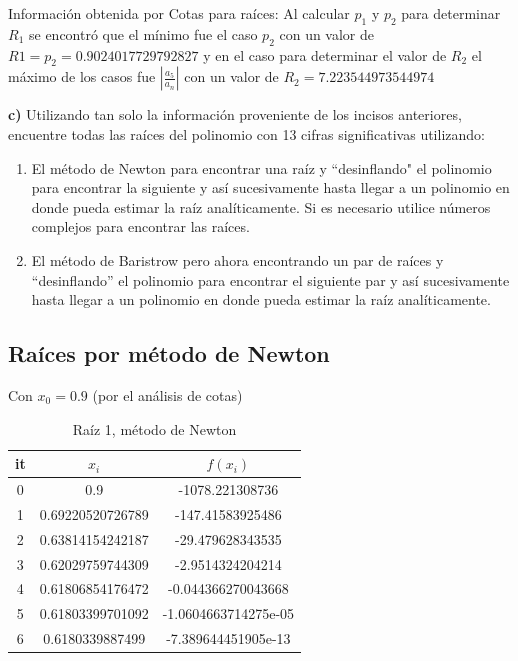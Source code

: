 \documentclass{article} %
\begin{document}
Información obtenida por Cotas para raíces: Al calcular $p_1$ y $p_2$ para determinar $R_1$ se encontró que el mínimo fue el caso $p_2$ con un valor de $R1= p_2 = 0.9024017729792827$ y en el caso para determinar el valor de $R_2$ el máximo de los casos fue $|\frac{a_5}{a_n}|$ con un valor de $R_2 = 7.223544973544974$

\textbf{c)} Utilizando tan solo la información proveniente de los incisos anteriores, encuentre todas las raíces del polinomio con 13 cifras significativas utilizando:

\begin{enumerate}
    \item El método de Newton para encontrar una raíz y ``desinflando" el polinomio para encontrar la siguiente y así sucesivamente hasta llegar a un polinomio en donde pueda estimar la raíz analíticamente. Si es necesario utilice números complejos para encontrar las raíces.
    \item El método de Baristrow pero ahora encontrando un par de raíces y ``desinflando'' el polinomio para encontrar el siguiente par y así sucesivamente hasta llegar a un polinomio en donde pueda estimar la raíz analíticamente.
\end{enumerate}

\subsection*{Raíces por método de Newton}

Con $x_0 = 0.9$ (por el análisis de cotas) 

\begin{table}[H]
\centering
\begin{tabular}{|c|c|c|}
\hline
it & $x_i$ & $f(x_i)$\\
\hline
0 & 0.9 & -1078.221308736\\
1 & 0.69220520726789 & -147.41583925486\\
2 & 0.63814154242187 & -29.479628343535\\
3 & 0.62029759744309 & -2.9514324204214\\
4 & 0.61806854176472 & -0.044366270043668\\
5 & 0.61803399701092 & -1.0604663714275e-05\\
6 & 0.6180339887499 & -7.389644451905e-13\\
\hline
\end{tabular}
\caption{Raíz 1, método de Newton}
\end{table}
\end{document}
